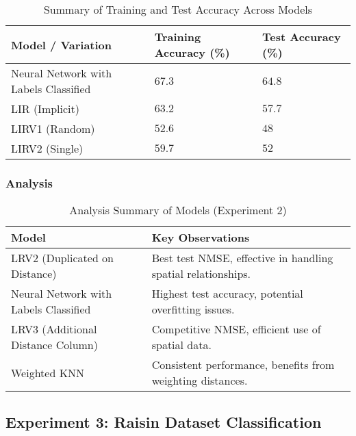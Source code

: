 \documentclass[a4paper, 12pt]{report}
\begin{document}
\begin{table}[H]
    \centering
    \caption{Summary of Training and Test Accuracy Across Models}
    \label{tab:summary_accuracy_all_models_accuracy_exp2}
    \footnotesize
    \begin{tabular}{|l|l|l|}
    \toprule
    \textbf{Model / Variation} & \textbf{Training Accuracy (\%)} & \textbf{Test Accuracy (\%)} \\
    \midrule
    Neural Network with Labels Classified & $67.3$ & $\mathbf{64.8}$ \\
    LIR (Implicit) & $63.2$ & $57.7$ \\
    LIRV1 (Random) & $52.6$ & $48$ \\
    LIRV2 (Single) & $59.7$ & $52$ \\
    \bottomrule
    \end{tabular}
\end{table}

\subsubsection{Analysis}

\begin{table}[H]
    \centering
    \caption{Analysis Summary of Models (Experiment 2)}
    \label{tab:concise_analysis_summary_exp2}
    \begin{tabular}{|l|l|}
    \hline
    \textbf{Model} & \textbf{Key Observations} \\
    \hline
    LRV2 (Duplicated on Distance) & Best test NMSE, effective in handling spatial relationships. \\
    \hline
    Neural Network with Labels Classified & Highest test accuracy, potential overfitting issues. \\
    \hline
    LRV3 (Additional Distance Column) & Competitive NMSE, efficient use of spatial data. \\
    \hline
    Weighted KNN & Consistent performance, benefits from weighting distances. \\
    \hline
    \end{tabular}
\end{table}

\subsection{Experiment 3: Raisin Dataset Classification}
\end{document}

